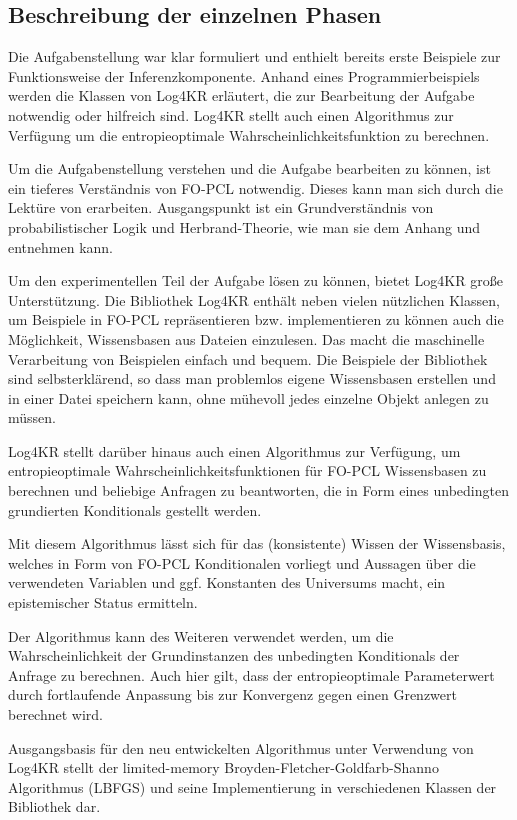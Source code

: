 \documentclass[a4paper, 11pt]{book}
\begin{document}
\subsection{Beschreibung der einzelnen Phasen}
Die Aufgabenstellung war klar formuliert und enthielt bereits erste Beispiele zur Funktionsweise der Inferenzkomponente. Anhand eines Programmierbeispiels werden die Klassen von Log4KR erläutert, die zur Bearbeitung der Aufgabe notwendig oder hilfreich sind. Log4KR stellt auch einen Algorithmus zur Verfügung um die entropieoptimale Wahrscheinlichkeitsfunktion zu berechnen.

Um die Aufgabenstellung verstehen und die Aufgabe bearbeiten zu können, ist ein tieferes Verständnis von FO-PCL notwendig. Dieses kann man sich durch die Lektüre von \cite{Fis10} erarbeiten. Ausgangspunkt ist ein Grundverständnis von probabilistischer Logik und Herbrand-Theorie, wie man sie dem Anhang und \cite{BK15} entnehmen kann.


Um den experimentellen Teil der Aufgabe lösen zu können, bietet Log4KR große Unterstützung.
Die Bibliothek Log4KR enthält neben vielen nützlichen Klassen, um Beispiele in FO-PCL repräsentieren bzw. implementieren zu können auch die Möglichkeit, Wissensbasen aus Dateien einzulesen. Das macht die maschinelle Verarbeitung von Beispielen einfach und bequem. Die Beispiele der Bibliothek sind selbsterklärend, so dass man problemlos eigene Wissensbasen erstellen und in einer Datei speichern kann, ohne mühevoll jedes einzelne Objekt anlegen zu müssen.

Log4KR stellt darüber hinaus auch einen Algorithmus zur Verfügung, um entropieoptimale Wahrscheinlichkeitsfunktionen für FO-PCL Wissensbasen zu berechnen und beliebige Anfragen zu beantworten, die in Form eines unbedingten grundierten Konditionals gestellt werden. 

Mit diesem Algorithmus lässt sich für das (konsistente) Wissen der Wissensbasis, welches in Form von FO-PCL Konditionalen vorliegt und Aussagen über die verwendeten Variablen und ggf. Konstanten des Universums macht, ein epistemischer Status ermitteln.

Der Algorithmus kann des Weiteren verwendet werden, um die Wahrscheinlichkeit der Grundinstanzen des unbedingten Konditionals der Anfrage zu berechnen. Auch hier gilt, dass der entropieoptimale Parameterwert durch fortlaufende Anpassung bis zur Konvergenz gegen einen Grenzwert berechnet wird. 

Ausgangsbasis für den neu entwickelten Algorithmus unter Verwendung von Log4KR stellt der limited-memory Broyden-Fletcher-Goldfarb-Shanno Algorithmus (LBFGS) und seine Implementierung in verschiedenen Klassen der Bibliothek dar. 
\end{document}
